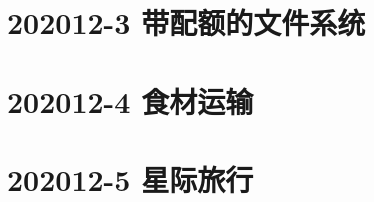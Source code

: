 \documentclass[cn,10pt,math=newtx,citestyle=gb7714-2015,bibstyle=gb7714-2015]{elegantbook}
\newif\ifonlyanalyze %
\begin{document}
\newpage
\section{202012-3 带配额的文件系统}
\ifonlyanalyze
\else
  
\fi


\newpage
\section{202012-4 食材运输}
\ifonlyanalyze
\else
  
\fi


\newpage
\section{202012-5 星际旅行}
\ifonlyanalyze
\else
  
\fi

\end{document}
